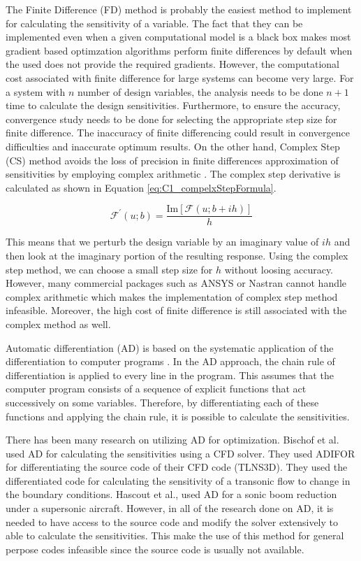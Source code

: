 The Finite Difference (FD) method is probably the easiest method to implement for calculating the sensitivity of a variable. The fact that they can be implemented even when a given computational model is a black box makes most gradient based optimzation algorithms perform finite differences by default when the used does not provide the required gradients. However, the computational cost associated with finite difference for large systems can become very large. For a system with $n$ number of design variables, the analysis needs to be done $n+1$ time to calculate the design sensitivities. Furthermore, to ensure the accuracy, convergence study needs to be done for selecting the appropriate step size for finite difference. The inaccuracy of finite differencing could result in convergence difficulties and inaccurate optimum results. On the other hand, Complex Step (CS) method avoids the loss of precision in finite differences approximation of sensitivities by employing complex arithmetic \cite{martins2003complex}. The complex step derivative is calculated as shown in Equation \eqref{eq:C1_compelxStepFormula}.

\begin{equation}\label{eq:C1_compelxStepFormula}
	\mathcal{F}^\prime\left(u; b\right) = \frac{\text{Im}\left[ \mathcal{F}\left(u; b + ih\right) \right]}{h}
\end{equation}

This means that we perturb the design variable by an imaginary value of $ih$ and then look at
the imaginary portion of the resulting response. Using the complex step method, we can choose a
small step size for $h$ without loosing accuracy. However, many commercial packages such as ANSYS or Nastran cannot handle complex arithmetic which makes the implementation of complex step method infeasible. Moreover, the high cost of finite difference is still associated with the complex method as well.

Automatic differentiation (AD) is based on the systematic application of the differentiation to computer programs \cite{naumann2012art}. In the AD approach, the chain rule of differentiation is applied to every line in the program. This assumes that the computer program consists of a sequence of explicit functions that act successively on some variables. Therefore, by differentiating each of these functions and applying the chain rule, it is possible to calculate the sensitivities. 

There has been many research on utilizing AD for optimization. Bischof et al. used AD for calculating the sensitivities using a CFD solver. They used ADIFOR for differentiating the source code of their CFD code (TLNS3D). They used the differentiated code for calculating the sensitivity of a transonic flow to change in the boundary conditions. Hascout et al., used AD for a sonic boom reduction under a supersonic aircraft. However, in all of the research done on AD, it is needed to have access to the source code and modify the solver extensively to able to calculate the sensitivities. This make the use of this method for general perpose codes infeasible since the source code is usually not available.